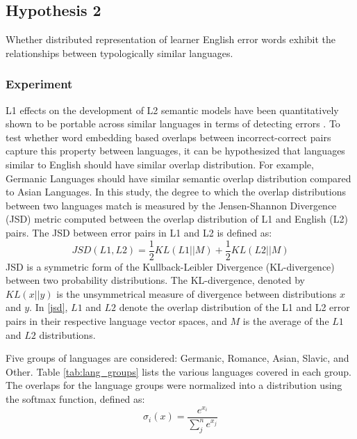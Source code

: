 \documentclass[10pt,letterpaper]{article}
\begin{document}
\subsection{Hypothesis 2}

Whether distributed representation of learner English error words exhibit the relationships between typologically similar languages.

\subsubsection{Experiment} L1 effects on the development of L2 semantic models have been quantitatively shown to be portable across similar languages in terms of detecting errors \cite{kochmarCrossLingualLexicoSemanticTransfer2016, kochmarModellingSemanticAcquisition2017}. 
To test whether word embedding based overlaps between incorrect-correct pairs capture this property between languages, it can be hypothesized that languages similar to English should have similar overlap distribution. For example, Germanic Languages should have similar semantic overlap distribution compared to Asian Languages. In this study, the degree to which the overlap distributions between two languages match is measured by the Jensen-Shannon Divergence (JSD) metric computed between the overlap distribution of L1 and English (L2) pairs. The JSD between error pairs in L1 and L2 is defined as: 
\begin{equation}
\label{jsd}
    JSD(L1, L2) = \frac{1}{2} KL(L1||M) + \frac{1}{2}KL(L2||M)
\end{equation}
JSD is a symmetric form of the Kullback-Leibler Divergence (KL-divergence) between two probability distributions. The KL-divergence, denoted by $KL(x||y)$ is the unsymmetrical measure of divergence between distributions $x$ and $y$. In \ref{jsd}, $L1$ and $L2$ denote the overlap distribution of the L1 and L2 error pairs in their respective language vector spaces, and $M$ is the average of the $L1$ and $L2$ distributions.

Five groups of languages are considered: Germanic, Romance, Asian, Slavic, and Other. Table \ref{tab:lang_groups} lists the various languages covered in each group. The overlaps for the language groups were normalized into a distribution using the softmax function, defined as:
\begin{equation}
    \label{softmax}
    \sigma_i(x) = \frac{e^{x_i}}{\sum^{n}_{j} e^{x_j}}
\end{equation}
\end{document}
